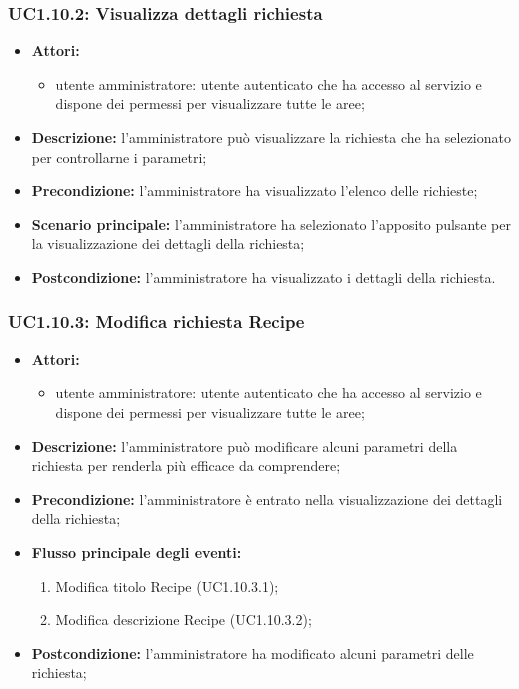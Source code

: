 \subsubsection{UC1.10.2: Visualizza dettagli richiesta}
	\begin{itemize}
		\item \textbf{Attori:}
		\begin{itemize}
			\item utente amministratore: utente autenticato che ha accesso al servizio e dispone dei permessi per visualizzare tutte le aree;
		\end{itemize}
		\item \textbf{Descrizione:} l'amministratore può visualizzare la richiesta che ha selezionato per controllarne i parametri;
		\item \textbf{Precondizione:} l'amministratore ha visualizzato l'elenco delle richieste;
		\item \textbf{Scenario principale:} l'amministratore ha selezionato l'apposito pulsante per la visualizzazione dei dettagli della richiesta;
		\item \textbf{Postcondizione:} l'amministratore ha visualizzato i dettagli della richiesta.
	\end{itemize}

\subsubsection{UC1.10.3: Modifica richiesta Recipe}
	\begin{itemize}
		\item \textbf{Attori:}
		\begin{itemize}
			\item utente amministratore: utente autenticato che ha accesso al servizio e dispone dei permessi per visualizzare tutte le aree;
		\end{itemize}
		\item \textbf{Descrizione:} l'amministratore può modificare alcuni parametri della richiesta per renderla più efficace da comprendere;
		\item \textbf{Precondizione:} l'amministratore è entrato nella visualizzazione dei dettagli della richiesta;
		\item \textbf{Flusso principale degli eventi:}
		\begin{enumerate}
			\item Modifica titolo Recipe (UC1.10.3.1);
			\item Modifica descrizione Recipe (UC1.10.3.2);
		\end{enumerate}
		\item \textbf{Postcondizione:} l'amministratore ha modificato alcuni parametri delle richiesta;
	\end{itemize}

